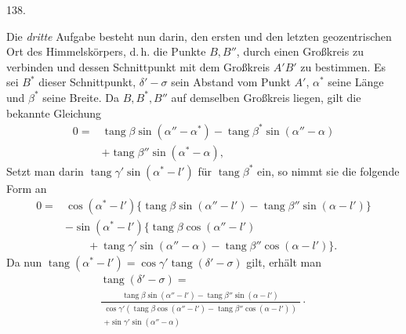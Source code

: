 \par{}\medskip
\begin{center}\hypertarget{native-185-article138}{}138.\end{center}
Die \emph{dritte} Aufgabe besteht nun darin, den ersten und den letzten geozentrischen Ort des
Himmelskörpers, d.\,h. die Punkte $B,B''$, durch einen Großkreis zu verbinden und dessen
Schnittpunkt mit dem Großkreis $A'B'$ zu bestimmen. Es sei $B^*$ dieser Schnittpunkt, $\delta'-\sigma$ sein
Abstand vom Punkt $A'$, $\alpha^*$ seine Länge und $\beta^*$ seine Breite. Da $B,B^*,B''$ auf demselben
Großkreis liegen, gilt die bekannte Gleichung
\[
\begin{aligned}
0={}&\operatorname{tang}\beta\sin(\alpha''-\alpha^*)-\operatorname{tang}\beta^*\sin(\alpha''-\alpha)\\
&+\operatorname{tang}\beta''\sin(\alpha^*-\alpha),
\end{aligned}
\]
Setzt man darin $\operatorname{tang}\gamma'\sin(\alpha^*-l')$ für $\operatorname{tang}\beta^*$ ein, so nimmt sie die folgende Form an
\[
\begin{aligned}
0={}&\cos(\alpha^*-l')\{\operatorname{tang}\beta\sin(\alpha''-l')-\operatorname{tang}\beta''\sin(\alpha-l')\}\\
&-\sin(\alpha^*-l')\{\operatorname{tang}\beta\cos(\alpha''-l')\\
&\qquad+\operatorname{tang}\gamma'\sin(\alpha''-\alpha)-\operatorname{tang}\beta''\cos(\alpha-l')\}.
\end{aligned}
\]
Da nun $\operatorname{tang}(\alpha^*-l')=\cos\gamma'\operatorname{tang}(\delta'-\sigma)$ gilt, erhält man
\[
\begin{gathered}
\operatorname{tang}(\delta'-\sigma)=\\[.4ex]
\frac{\operatorname{tang}\beta\sin(\alpha''-l')-\operatorname{tang}\beta''\sin(\alpha-l')}{\begin{gathered}\cos\gamma'(\operatorname{tang}\beta\cos(\alpha''-l')-\operatorname{tang}\beta''\cos(\alpha-l'))\\+\sin\gamma'\sin(\alpha''-\alpha)\end{gathered}}\mathpunct{\cdot}
\end{gathered}
\]

